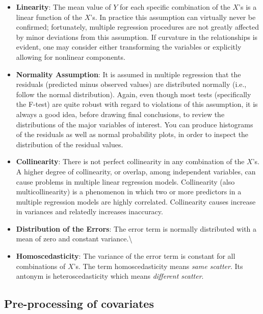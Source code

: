 \documentclass[10pt,b5paper,]{book}
\theoremstyle{definition}
\theoremstyle{definition}
\theoremstyle{definition}
\theoremstyle{remark}
\begin{document}
\begin{itemize}
\item
  \textbf{Linearity}: The mean value of \(Y\) for each specific
  combination of the \(X\)'s is a linear function of the \(X\)'s. In
  practice this assumption can virtually never be confirmed;
  fortunately, multiple regression procedures are not greatly affected
  by minor deviations from this assumption. If curvature in the
  relationships is evident, one may consider either transforming the
  variables or explicitly allowing for nonlinear components.\\
\item
  \textbf{Normality Assumption}: It is assumed in multiple regression
  that the residuals (predicted minus observed values) are distributed
  normally (i.e., follow the normal distribution). Again, even though
  most tests (specifically the F-test) are quite robust with regard to
  violations of this assumption, it is always a good idea, before
  drawing final conclusions, to review the distributions of the major
  variables of interest. You can produce histograms of the residuals as
  well as normal probability plots, in order to inspect the distribution
  of the residual values.\\
\item
  \textbf{Collinearity}: There is not perfect collinearity in any
  combination of the \(X\)'s. A higher degree of collinearity, or
  overlap, among independent variables, can cause problems in multiple
  linear regression models. Collinearity (also multicollinearity) is a
  phenomenon in which two or more predictors in a multiple regression
  models are highly correlated. Collinearity causes increase in
  variances and relatedly increases inaccuracy.\\
\item
  \textbf{Distribution of the Errors}: The error term is normally
  distributed with a mean of zero and constant variance.\textbackslash{}
\item
  \textbf{Homoscedasticity}: The variance of the error term is constant
  for all combinations of \(X\)'s. The term homoscedasticity means
  \emph{same scatter}. Its antonym is heteroscedasticity which means
  \emph{different scatter}.
\end{itemize}

\hypertarget{pre-processing-of-covariates}{%
\subsection{Pre-processing of
covariates}\label{pre-processing-of-covariates}}
\end{document}
